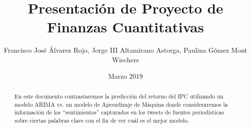 \documentclass[12pt,reqno,letter]{article}
\begin{document}
	\title{ Presentaci\'on de Proyecto de Finanzas Cuantitativas}
	\author{Francisco José Álvarez Rojo, Jorge III Altamirano Astorga, Paulina G\'omez Mont Wiechers}
	\date{Marzo 2019}
	\maketitle
	
	\begin{abstract}
		En este documento contrastaremos la predicción del retorno del IPC utilizando un modelo ARIMA vs. un modelo de Aprendizaje de Máquina donde consideraremos la información de los ``sentimientos'' capturados en los tweets de fuentes periodísticas sobre ciertas palabras clave con el fin de ver cuál es el mejor modelo.
	\end{abstract}
\end{document}
